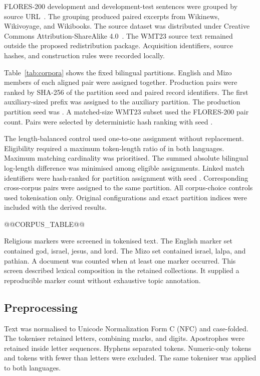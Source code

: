 \documentclass[12pt]{article}
\begin{document}
FLORES-200 development and development-test sentences were grouped by source URL~\cite{flores}. The grouping produced \MatchedPairs{} paired excerpts from Wikinews, Wikivoyage, and Wikibooks. The source dataset was distributed under Creative Commons Attribution-ShareAlike 4.0~\cite{floresrepo}. The WMT23 source text remained outside the proposed redistribution package. Acquisition identifiers, source hashes, and construction rules were recorded locally.

Table~\ref{tab:corpora} shows the fixed bilingual partitions. English and Mizo members of each aligned pair were assigned together. Production pairs were ranked by SHA-256 of the partition seed and paired record identifiers. The first auxiliary-sized prefix was assigned to the auxiliary partition. The production partition seed was \ProductionSplitSeed{}. A matched-size WMT23 subset used the FLORES-200 pair count. Pairs were selected by deterministic hash ranking with seed \MatchedSelectionSeed{}.

The length-balanced control used one-to-one assignment without replacement. Eligibility required a maximum token-length ratio of \LengthRatio{} in both languages. Maximum matching cardinality was prioritised. The summed absolute bilingual log-length difference was minimised among eligible assignments. Linked match identifiers were hash-ranked for partition assignment with seed \BalancedSplitSeed{}. Corresponding cross-corpus pairs were assigned to the same partition. All corpus-choice controls used tokenisation only. Original configurations and exact partition indices were included with the derived results.

@@CORPUS_TABLE@@

Religious markers were screened in tokenised text. The English marker set contained god, israel, jesus, and lord. The Mizo set contained israel, lalpa, and pathian. A document was counted when at least one marker occurred. This screen described lexical composition in the retained collections. It supplied a reproducible marker count without exhaustive topic annotation.

\subsection{Preprocessing}
Text was normalised to Unicode Normalization Form C (NFC) and case-folded. The tokeniser retained letters, combining marks, and digits. Apostrophes were retained inside letter sequences. Hyphens separated tokens. Numeric-only tokens and tokens with fewer than \MinimumLetters{} letters were excluded. The same tokeniser was applied to both languages.
\end{document}
